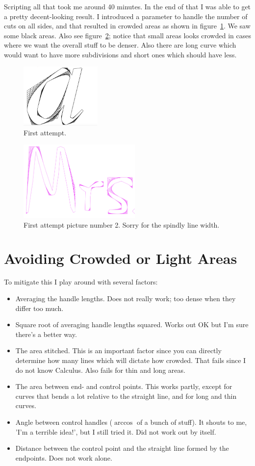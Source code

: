 \documentclass{article}
\begin{document}
	Scripting all that took me around 40 minutes. In the end of that I was able to get a pretty decent-looking result. I introduced a parameter to handle the number of cuts on all sides, and that resulted in crowded areas as shown in figure~\ref{crowded}. We saw some black areas. Also see figure~\ref{crowd2}; notice that small areas looks crowded in cases where we want the overall stuff to be denser. Also there are long curve which would want to have more subdivisions and short ones which should have less.
	\begin{figure}\centering
		\includegraphics[width=4cm]{picture2}
		\caption{First attempt.\label{crowded}}
	\end{figure}
	\begin{figure}\centering
		\includegraphics[width=6cm]{bad}
		\caption{First attempt picture number 2. Sorry for the spindly line width.\label{crowd2}}
	\end{figure}
	
	\section{Avoiding Crowded or Light Areas}
	To mitigate this I play around with several factors:
	\begin{itemize}[nosep]
		\item Averaging the handle lengths. Does not really work; too dense when they differ too much.
		\item Square root of averaging handle lengths squared. Works out OK but I'm sure there's a better way.
		\item The area stitched. This is an important factor since you can directly determine how many lines which will dictate how crowded. That fails since I do not know Calculus. Also fails for thin and long areas.
		\item The area between end- and control points. This works partly, except for curves that bends a lot relative to the straight line, and for long and thin curves.
		\item Angle between control handles (\(\arccos\) of a bunch of stuff). It shouts to me, 'I'm a terrible idea!', but I still tried it. Did not work out by itself.
		\item Distance between the control point and the straight line formed by the endpoints. Does not work alone.
	\end{itemize}
	
\end{document}
